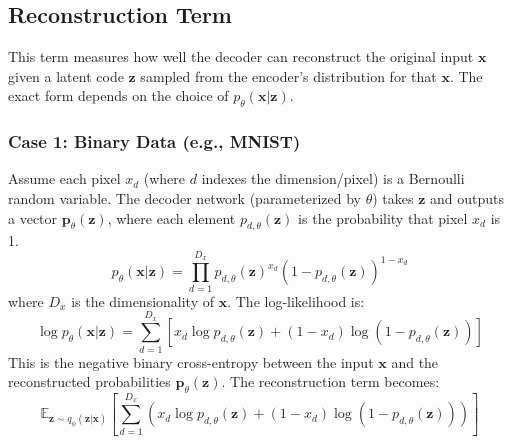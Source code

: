 \documentclass[11pt, letterpaper]{article}
\newcommand{\vx}{\boldsymbol{x}} %
\newcommand{\vz}{\boldsymbol{z}} %
\newcommand{\E}{\mathbb{E}} %
\begin{document}
\subsection{Reconstruction Term}
This term measures how well the decoder can reconstruct the original input $\vx$ given a latent code $\vz$ sampled from the encoder's distribution for that $\vx$. The exact form depends on the choice of $p_{\theta}(\vx|\vz)$.

\subsubsection{Case 1: Binary Data (e.g., MNIST)}
Assume each pixel $x_d$ (where $d$ indexes the dimension/pixel) is a Bernoulli random variable. The decoder network (parameterized by $\theta$) takes $\vz$ and outputs a vector $\boldsymbol{p}_{\theta}(\vz)$, where each element $p_{d, \theta}(\vz)$ is the probability that pixel $x_d$ is 1.
\begin{equation}
    p_{\theta}(\vx|\vz) = \prod_{d=1}^{D_x} p_{d, \theta}(\vz)^{x_d} (1 - p_{d, \theta}(\vz))^{1-x_d}
\end{equation}
where $D_x$ is the dimensionality of $\vx$.
The log-likelihood is:
\begin{equation}
    \log p_{\theta}(\vx|\vz) = \sum_{d=1}^{D_x} \left[ x_d \log p_{d, \theta}(\vz) + (1 - x_d) \log(1 - p_{d, \theta}(\vz)) \right]
\end{equation}
This is the negative binary cross-entropy between the input $\vx$ and the reconstructed probabilities $\boldsymbol{p}_{\theta}(\vz)$. The reconstruction term becomes:
\begin{equation}
    \E_{\vz \sim q_{\phi}(\vz|\vx)} \left[ \sum_{d=1}^{D_x} \left( x_d \log p_{d, \theta}(\vz) + (1 - x_d) \log(1 - p_{d, \theta}(\vz)) \right) \right]
\end{equation}
\end{document}
